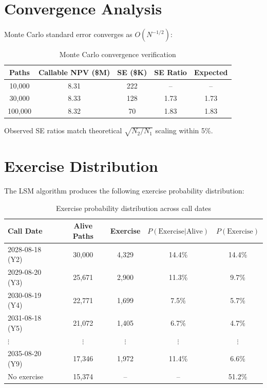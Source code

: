 \documentclass[11pt,a4paper]{article}
\begin{document}
\section{Convergence Analysis}

Monte Carlo standard error converges as $O(N^{-1/2})$:

\begin{table}[H]
\centering
\begin{tabular}{ccccc}
\toprule
\textbf{Paths} & \textbf{Callable NPV (\$M)} & \textbf{SE (\$K)} & \textbf{SE Ratio} & \textbf{Expected}\\
\midrule
10,000 & 8.31 & 222 & -- & --\\
30,000 & 8.33 & 128 & 1.73 & 1.73\\
100,000 & 8.32 & 70 & 1.83 & 1.83\\
\bottomrule
\end{tabular}
\caption{Monte Carlo convergence verification}
\end{table}

Observed SE ratios match theoretical $\sqrt{N_2/N_1}$ scaling within 5\%.

\section{Exercise Distribution}

The LSM algorithm produces the following exercise probability distribution:

\begin{table}[H]
\centering
\begin{tabular}{lcccc}
\toprule
\textbf{Call Date} & \textbf{Alive Paths} & \textbf{Exercise} & $P(\text{Exercise}|\text{Alive})$ & $P(\text{Exercise})$\\
\midrule
2028-08-18 (Y2) & 30,000 & 4,329 & 14.4\% & 14.4\%\\
2029-08-20 (Y3) & 25,671 & 2,900 & 11.3\% & 9.7\%\\
2030-08-19 (Y4) & 22,771 & 1,699 & 7.5\% & 5.7\%\\
2031-08-18 (Y5) & 21,072 & 1,405 & 6.7\% & 4.7\%\\
$\vdots$ & $\vdots$ & $\vdots$ & $\vdots$ & $\vdots$\\
2035-08-20 (Y9) & 17,346 & 1,972 & 11.4\% & 6.6\%\\
No exercise & 15,374 & -- & -- & 51.2\%\\
\bottomrule
\end{tabular}
\caption{Exercise probability distribution across call dates}
\end{table}
\end{document}
